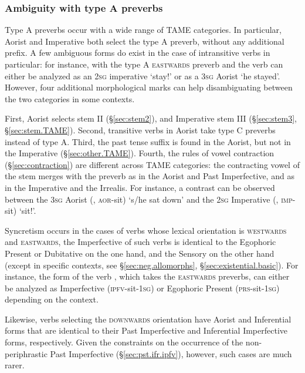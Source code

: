 \subsubsection{Ambiguity with type A preverbs} \label{sec:ambiguity.preverb}
Type A preverbs occur with a wide range of TAME categories. In particular, Aorist and Imperative both select the type A preverb, without any additional prefix. A few ambiguous forms do exist in the case of intransitive verbs in particular: for instance,  with the type A \textsc{eastwards} preverb  and the verb  can either be analyzed as an \textsc{2sg} imperative `stay!' or as a \textsc{3sg} Aorist `he stayed'. However, four additional morphological marks can help disambiguating between the two categories in some contexts. 

First, Aorist selects stem II (§\ref{sec:stem2}), and Imperative stem III (§\ref{sec:stem3}, §\ref{sec:stem.TAME}). Second,  transitive verbs in Aorist take type C preverbs instead of type A. Third, the  past tense suffix is found in the Aorist, but not in the Imperative (§\ref{sec:other.TAME}). Fourth, the rules of vowel contraction (§\ref{sec:contraction}) are different across TAME categories: the contracting vowel of the stem merges with the preverb as  in the Aorist and Past Imperfective, and as  in the Imperative and the Irrealis. For instance, a contrast can be observed between the \textsc{3sg} Aorist  (, \textsc{aor}-sit) `s/he sat down' and the \textsc{2sg} Imperative   (, \textsc{imp}-sit) `sit!'.

Syncretism occurs in the cases of verbs whose lexical orientation is  \textsc{westwards} and \textsc{eastwards}, the Imperfective of such verbs is identical to the Egophoric Present or Dubitative on the one hand, and the Sensory on the other hand (except in specific contexts, see §\ref{sec:neg.allomorphs}, §\ref{sec:existential.basic}). For instance, the form  of the verb , which takes the \textsc{eastwards} preverbs, can either be analyzed as Imperfective (\textsc{ipfv}-sit-\textsc{1sg}) or Egophoric Present (\textsc{prs}-sit-\textsc{1sg}) depending on the context.

Likewise, verbs selecting the \textsc{downwards} orientation have Aorist and Inferential forms that are identical to their Past Imperfective and Inferential Imperfective forms, respectively. Given the constraints on the occurrence of the non-periphrastic  Past Imperfective (§\ref{sec:pst.ifr.ipfv}), however, such cases are much rarer.

